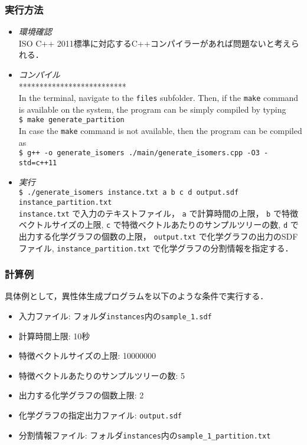 \documentclass[11pt,titlepage,dvipdfmx,twoside]{jarticle}
\begin{document}
\subsubsection{実行方法}
\label{sec:compile_m}
\begin{itemize}
	\item {\em 環境確認}\\
		ISO C++ 2011標準に対応するC++コンパイラーがあれば問題ないと考えられる．
	\item {\em コンパイル}\\
	**************************\\
	      In the terminal, navigate to the {\tt files} subfolder.
	      Then, if the {\tt make} command is available on the system, the program can be simply compiled by typing \\
	      \verb|$ make generate_partition|\\
	      In case the {\tt make} command is not available, then the program can be compiled as \\	  
		\verb|$ g++ -o generate_isomers ./main/generate_isomers.cpp -O3 -std=c++11| 
	\item {\em 実行}\\
		\verb|$ ./generate_isomers instance.txt a b c d output.sdf instance_partition.txt|\\
		\verb|instance.txt| で入力のテキストファイル，
		\verb|a| で計算時間の上限，
		\verb|b| で特徴ベクトルサイズの上限,
		\verb|c| で特徴ベクトルあたりのサンプルツリーの数,
		\verb|d| で出力する化学グラフの個数の上限，
		\verb|output.txt| で化学グラフの出力のSDFファイル,
		\verb|instance_partition.txt| で化学グラフの分割情報を指定する．
\end{itemize}


\subsubsection{計算例}
\label{sec:instance_g}

具体例として，異性体生成プログラムを以下のような条件で実行する．

\begin{itemize}
\item 入力ファイル: フォルダ{\tt instances}内の{\tt sample\_1.sdf}
\item 計算時間上限: 10秒
\item 特徴ベクトルサイズの上限: 10000000
\item 特徴ベクトルあたりのサンプルツリーの数: 5
\item 出力する化学グラフの個数上限: 2
\item 化学グラフの指定出力ファイル: {\tt output.sdf}
\item 分割情報ファイル: フォルダ{\tt instances}内の{\tt sample\_1\_partition.txt}
\end{itemize}
\end{document}
